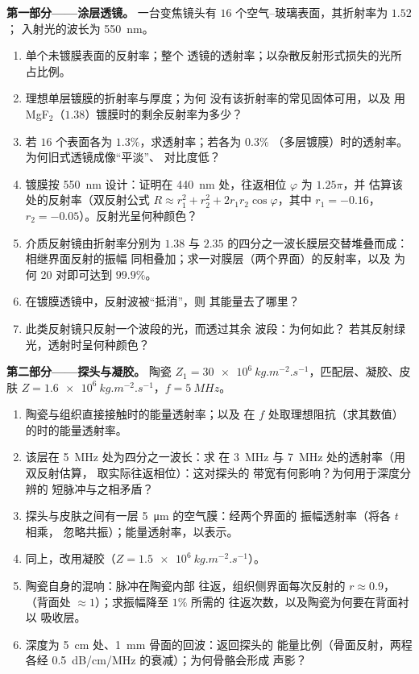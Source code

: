 \begin{problem}
\label{pb:b2:wave-interfaces:1}

\medskip
\noindent\textbf{第一部分——涂层透镜。}
一台变焦镜头有 $16$ 个空气–玻璃表面，其折射率为 $1.52$；
入射光的波长为 \qty{550}{nm}。
\begin{enumerate}
  \item 单个未镀膜表面的反射率；整个
        透镜的透射率；以杂散反射形式损失的光所占比例。
  \item 理想单层镀膜的折射率与厚度；为何
        没有该折射率的常见固体可用，以及
        用 MgF$_2$（$1.38$）镀膜时的剩余反射率为多少？
  \item 若 $16$ 个表面各为 $1.3\%$，求透射率；若各为 $0.3\%$
        （多层镀膜）时的透射率。为何旧式透镜成像“平淡”、
        对比度低？
  \item 镀膜按 \qty{550}{nm} 设计：证明在
        \qty{440}{nm} 处，往返相位 $\varphi$ 为 $1.25\pi$，并
        估算该处的反射率（双反射公式 $R
        \approx r_1^2 + r_2^2 + 2r_1r_2\cos\varphi$，其中 $r_1 = -0.16$，$r_2 =
        -0.05$）。反射光呈何种颜色？
  \item 介质反射镜由折射率分别为 $1.38$ 与
        $2.35$ 的四分之一波长膜层交替堆叠而成：相继界面反射的振幅
        同相叠加；求一对膜层（两个界面）的反射率，以及
        为何 $20$ 对即可达到 $99.9\%$。
  \item 在镀膜透镜中，反射波被“抵消”，则
        其能量去了哪里？
  \item 此类反射镜只反射一个波段的光，而透过其余
        波段：为何如此？
        若其反射绿光，透射时呈何种颜色？
\end{enumerate}

\medskip
\noindent\textbf{第二部分——探头与凝胶。}
陶瓷 $Z_1 = \qty{30e6}{kg.m^{-2}.s^{-1}}$，匹配层、凝胶、皮肤 $Z =
\qty{1.6e6}{kg.m^{-2}.s^{-1}}$，$f = \qty{5}{MHz}$。
\begin{enumerate}[resume]
  \item 陶瓷与组织直接接触时的能量透射率；以及
        在 $f$ 处取理想阻抗（求其数值）的时的能量透射率。
  \item 该层在 \qty{5}{MHz} 处为四分之一波长：求
        在 \qty{3}{MHz} 与 \qty{7}{MHz} 处的透射率（用双反射估算，
        取实际往返相位）：这对探头的
        带宽有何影响？为何用于深度分辨的
        短脉冲与之相矛盾？
  \item 探头与皮肤之间有一层 \qty{5}{\micro m} 的空气膜：经两个界面的
        振幅透射率（将各 $t$ 相乘，
        忽略共振）；能量透射率，以表示。
  \item 同上，改用凝胶（$Z = \qty{1.5e6}{kg.m^{-2}.s^{-1}}$）。
  \item 陶瓷自身的混响：脉冲在陶瓷内部
        往返，组织侧界面每次反射的 $r \approx 0.9$，
        （背面处 $\approx 1$）；求振幅降至 $1\%$ 所需的
        往返次数，以及陶瓷为何要在背面衬以
        吸收层。
  \item 深度为 \qty{5}{cm} 处、\qty{1}{mm} 骨面的回波：返回探头的
        能量比例（骨面反射，两程各经
        \qty{0.5}{dB/cm/MHz} 的衰减）；为何骨骼会形成
        声影？
\end{enumerate}


\end{problem}
